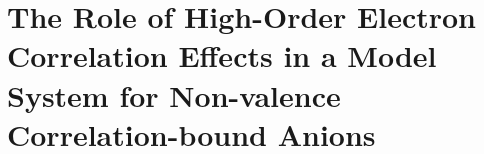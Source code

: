 \chapter{ The Role of High-Order Electron Correlation Effects in a Model System for Non-valence Correlation-bound Anions}



%



